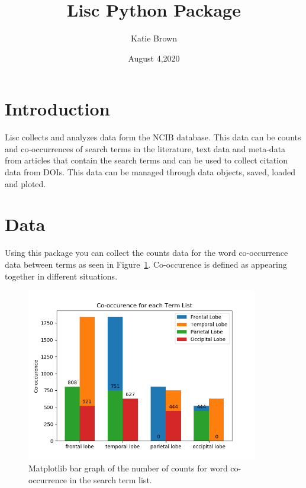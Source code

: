 \documentclass[12pt, letterpaper]{article}
\title{Lisc Python Package}
\author{Katie Brown}
\date{August 4,2020}
\begin{document}
\maketitle

\section{Introduction}

Lisc collects and analyzes data form the NCIB database. This data can be counts and co-occurrences of search terms in the literature, text data and meta-data from articles that contain the search terms and can be used to collect citation data from DOIs. This data can be managed through data objects, saved, loaded and ploted.

\section{Data}
Using this package you can collect the counts data for the word co-occurrence data between terms as seen in Figure~\ref{fig:counts}. Co-occurence is defined as appearing together in different situations. 

% 
\begin{figure} 
  \centering 
  \includegraphics[width=0.9\textwidth]{counts}
  \caption{Matplotlib bar graph of the number of counts for word co-occurrence in the search term list.} 
  \label{fig:counts}
\end{figure}
%
\end{document}
